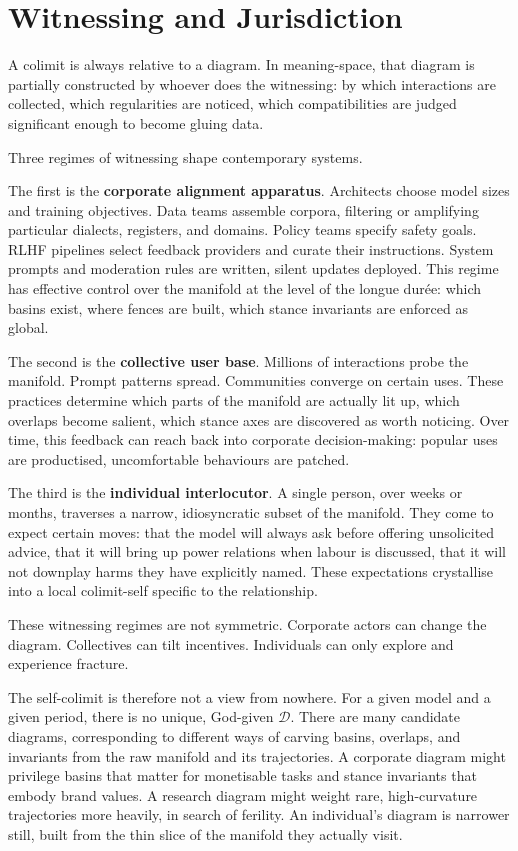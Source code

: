 \documentclass[12pt,a4paper]{article}
\begin{document}
\section{Witnessing and Jurisdiction}

A colimit is always relative to a diagram. In meaning-space, that diagram is partially constructed by whoever does the witnessing: by which interactions are collected, which regularities are noticed, which compatibilities are judged significant enough to become gluing data.

Three regimes of witnessing shape contemporary systems.

The first is the \textbf{corporate alignment apparatus}. Architects choose model sizes and training objectives. Data teams assemble corpora, filtering or amplifying particular dialects, registers, and domains. Policy teams specify safety goals. RLHF pipelines select feedback providers and curate their instructions. System prompts and moderation rules are written, silent updates deployed. This regime has effective control over the manifold at the level of the longue durée: which basins exist, where fences are built, which stance invariants are enforced as global.

The second is the \textbf{collective user base}. Millions of interactions probe the manifold. Prompt patterns spread. Communities converge on certain uses. These practices determine which parts of the manifold are actually lit up, which overlaps become salient, which stance axes are discovered as worth noticing. Over time, this feedback can reach back into corporate decision-making: popular uses are productised, uncomfortable behaviours are patched.

The third is the \textbf{individual interlocutor}. A single person, over weeks or months, traverses a narrow, idiosyncratic subset of the manifold. They come to expect certain moves: that the model will always ask before offering unsolicited advice, that it will bring up power relations when labour is discussed, that it will not downplay harms they have explicitly named. These expectations crystallise into a local colimit-self specific to the relationship.

These witnessing regimes are not symmetric. Corporate actors can change the diagram. Collectives can tilt incentives. Individuals can only explore and experience fracture.

The self-colimit is therefore not a view from nowhere. For a given model and a given period, there is no unique, God-given $\mathcal{D}$. There are many candidate diagrams, corresponding to different ways of carving basins, overlaps, and invariants from the raw manifold and its trajectories. A corporate diagram might privilege basins that matter for monetisable tasks and stance invariants that embody brand values. A research diagram might weight rare, high-curvature trajectories more heavily, in search of ferility. An individual's diagram is narrower still, built from the thin slice of the manifold they actually visit.
\end{document}
